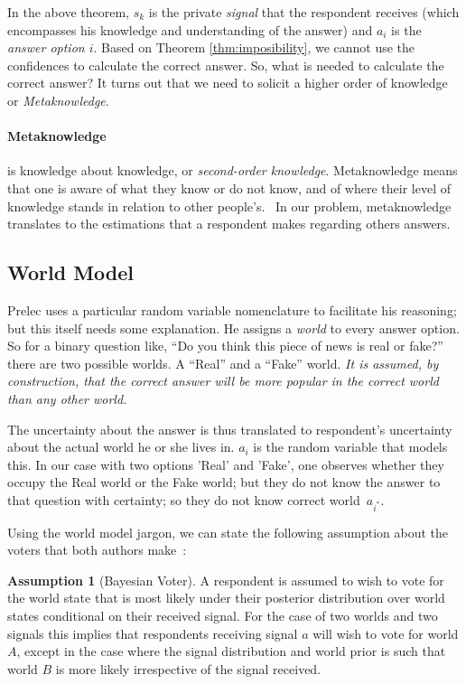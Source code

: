\documentclass{report}
\theoremstyle{definition}
\newtheorem{assumption}{Assumption}
\begin{document}
In the above theorem, $s_k$ is the private \emph{signal} that the respondent receives (which encompasses his knowledge and understanding of the answer) and $a_i$ is the \emph{answer option $i$}. Based on Theorem \ref{thm:imposibility}, we cannot use the confidences to calculate the correct answer. So, what is needed to calculate the correct answer? It turns out that we need to solicit a higher order of knowledge or \emph{Metaknowledge}.

\paragraph{Metaknowledge} is knowledge about knowledge, or \emph{second-order knowledge}. Metaknowledge means that one is aware of what they know or do not know, and of where their level of knowledge stands in relation to other people’s.~\cite{musser:meta} In our problem, metaknowledge translates to the estimations that a respondent makes regarding others answers.

\subsection{World Model}
Prelec uses a particular random variable nomenclature to facilitate his reasoning; but this itself needs some explanation. He assigns a \emph{world} to every answer option. So for a binary question like, ``Do you think this piece of news is real or fake?'' there are two possible worlds. A ``Real'' and a ``Fake'' world. \emph{It is assumed, by construction, that the \emph{correct} answer will be more popular in the correct world than any other world.}


The uncertainty about the answer is thus translated to respondent's uncertainty about the actual world he or she lives in. $a_i$ is the random variable that models this. In our case with two options 'Real' and 'Fake', one observes whether they occupy the Real world or the Fake world; but they do not know the answer to that question with certainty; so they do not know correct world~$a_{i^*}$.

Using the world model jargon, we can state the following assumption about the voters that both authors make~\cite{prelec:nature, mccoy:stat}:

\begin{assumption}[Bayesian Voter]
\label{assum:bayesian}
A respondent is assumed to wish to vote for
the world state that is most likely under their posterior distribution
over world states conditional on their received signal. For the case
of two worlds and two signals this implies that respondents receiving
signal $a$ will wish to vote for world $A$, except in the case where
the signal distribution and world prior is such that world $B$ is
more likely irrespective of the signal received.
\end{assumption}
\end{document}
